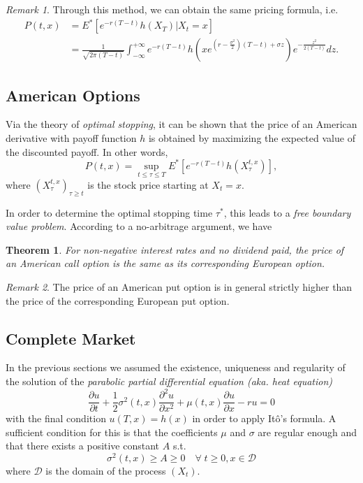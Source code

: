 \documentclass[a4paper,12pt]{article}
\numberwithin{equation}{section}
\newtheorem{theorem}{Theorem}[section]
\theoremstyle{definition}
\theoremstyle{remark}
\newtheorem{remark}{Remark}[section]
\begin{document}
\begin{remark}
Through this method, we can obtain the same pricing formula, i.e. 
\begin{equation}
    \begin{split}
        P(t,x)&=E^{*}[e^{-r(T-t)}h(X_{T})|X_{t}=x] \\
        &=\frac{1}{\sqrt{2\pi(T-t)}}\int_{-\infty}^{+\infty} e^{-r(T-t)}h(xe^{(r-\frac{\sigma^{2}}{2})(T-t)+\sigma z})e^{-\frac{z^{2}}{2(T-t)}} dz.
    \end{split}
\end{equation}
\end{remark}

\subsection*{American Options}
Via the theory of \textit{optimal stopping}, it can be shown 
that the price of an American derivative with payoff function $h$ 
is obtained by maximizing the expected value of the discounted 
payoff. In other words, 
\begin{equation}
\label{eq:American_formula}
    P(t,x)=\sup_{t\leq\tau\leq T} E^{*}[e^{-r(T-t)}h(X_{\tau}^{t,x})],
\end{equation}
where $(X_{\tau}^{t,x})_{\tau\geq t}$ is the stock price starting 
at $X_{t}=x$.

In order to determine the optimal stopping time $\tau^{*}$, this 
leads to a \textit{free boundary value problem}. According to a 
no-arbitrage argument, we have 

\begin{theorem}
For non-negative interest rates and no dividend paid, the price of 
an American call option is the same as its corresponding European 
option.
\end{theorem}

\begin{remark}
The price of an American put option is in general strictly higher 
than the price of the corresponding European put option.
\end{remark}

\subsection*{Complete Market}
In the previous sections we assumed the existence, uniqueness and regularity 
of the solution of the \textit{parabolic partial differential 
equation (aka. heat equation)} 
\begin{equation}
\label{eq:parabolic_pde}
    \frac{\partial u}{\partial t}
    +\frac{1}{2}\sigma^{2}(t,x)\frac{\partial^{2} u}{\partial {x}^{2}}
    +\mu(t,x)\frac{\partial u}{\partial x}-ru=0
\end{equation}
with the final condition $u(T,x)=h(x)$ in order to apply It\^o's formula. 
A sufficient condition for this is that the coefficients $\mu$ and $\sigma$ 
are regular enough and that there exists a positive constant $A$ s.t.
\begin{equation}
\label{eq:sigma_not_too_small}
    \sigma^{2}(t,x)\geq A\geq 0\quad \forall\; t\geq 0,x\in \mathcal{D}
\end{equation}
where $\mathcal{D}$ is the domain of the process $(X_t)$.
\end{document}
